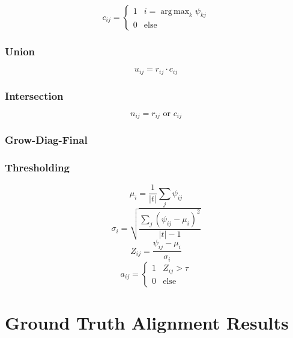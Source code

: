 \documentclass[twoside,twocolumn]{article}
\DeclareMathOperator*{\argmax}{arg\,max}
\begin{document}
\begin{equation}
  c_{ij} = \begin{cases}
    1 & i=\argmax_k \psi_{kj} \\
    0 & \text{else}
  \end{cases}
\end{equation}

\subsubsection{Union}

\begin{equation}
  u_{ij} = r_{ij} \cdot c_{ij}
\end{equation}

\subsubsection{Intersection}

\begin{equation}
  n_{ij} = r_{ij} \text{ or } c_{ij}
\end{equation}

\subsubsection{Grow-Diag-Final}

\subsubsection{Thresholding}

\begin{equation}
  \mu_{i} = \frac{1}{|t|} \sum_j \psi_{ij}
\end{equation}
\begin{equation}
  \sigma_{i} = \sqrt{\frac{\sum_j \left( \psi_{ij} - \mu_i \right)^2}{|t|-1}}
\end{equation}
\begin{equation}
  Z_{ij} = \frac{\psi_{ij} - \mu_i}{\sigma_i}
\end{equation}
\begin{equation}
  a_{ij} = \begin{cases}
    1 & Z_{ij} > \tau \\
    0 & \text{else}
  \end{cases}
\end{equation}


\section{Ground Truth Alignment Results}
\end{document}
